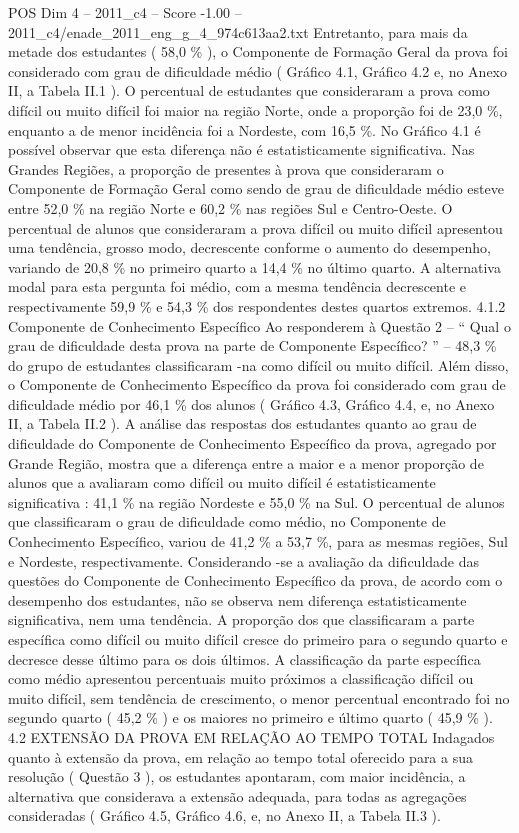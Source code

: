 \begin{textsample}{POS Dim 4 – 2011\_c4 – Score -1.00 – 2011\_c4/enade\_2011\_eng\_g\_4\_974c613aa2.txt}
Entretanto, para mais da metade dos estudantes ( 58,0 \% ), o Componente de Formação Geral da prova foi considerado com grau de dificuldade médio ( Gráfico 4.1, Gráfico 4.2 e, no Anexo II, a Tabela II.1 ).
O percentual de estudantes que consideraram a prova como difícil ou muito difícil foi maior na região Norte, onde a proporção foi de 23,0 \%, enquanto a de menor incidência foi a Nordeste, com 16,5 \%.
No Gráfico 4.1 é possível observar que esta diferença não é estatisticamente significativa.
Nas Grandes Regiões, a proporção de presentes à prova que consideraram o Componente de Formação Geral como sendo de grau de dificuldade médio esteve entre 52,0 \% na região Norte e 60,2 \% nas regiões Sul e Centro-Oeste.
O percentual de alunos que consideraram a prova difícil ou muito difícil apresentou uma tendência, grosso modo, decrescente conforme o aumento do desempenho, variando de 20,8 \% no primeiro quarto a 14,4 \% no último quarto.
A alternativa modal para esta pergunta foi médio, com a mesma tendência decrescente e respectivamente 59,9 \% e 54,3 \% dos respondentes destes quartos extremos. 4.1.2 Componente de Conhecimento Específico Ao responderem à Questão 2 – “ Qual o grau de dificuldade desta prova na parte de Componente Específico? ” – 48,3 \% do grupo de estudantes classificaram -na como difícil ou muito difícil.
Além disso, o Componente de Conhecimento Específico da prova foi considerado com grau de dificuldade médio por 46,1 \% dos alunos ( Gráfico 4.3, Gráfico 4.4, e, no Anexo II, a Tabela II.2 ).
A análise das respostas dos estudantes quanto ao grau de dificuldade do Componente de Conhecimento Específico da prova, agregado por Grande Região, mostra que a diferença entre a maior e a menor proporção de alunos que a avaliaram como difícil ou muito difícil é estatisticamente significativa : 41,1 \% na região Nordeste e 55,0 \% na Sul.
O percentual de alunos que classificaram o grau de dificuldade como médio, no Componente de Conhecimento Específico, variou de 41,2 \% a 53,7 \%, para as mesmas regiões, Sul e Nordeste, respectivamente.
Considerando -se a avaliação da dificuldade das questões do Componente de Conhecimento Específico da prova, de acordo com o desempenho dos estudantes, não se observa nem diferença estatisticamente significativa, nem uma tendência.
A proporção dos que classificaram a parte específica como difícil ou muito difícil cresce do primeiro para o segundo quarto e decresce desse último para os dois últimos.
A classificação da parte específica como médio apresentou percentuais muito próximos a classificação difícil ou muito difícil, sem tendência de crescimento, o menor percentual encontrado foi no segundo quarto ( 45,2 \% ) e os maiores no primeiro e último quarto ( 45,9 \% ). 4.2 EXTENSÃO DA PROVA EM RELAÇÃO AO TEMPO TOTAL Indagados quanto à extensão da prova, em relação ao tempo total oferecido para a sua resolução ( Questão 3 ), os estudantes apontaram, com maior incidência, a alternativa que considerava a extensão adequada, para todas as agregações consideradas ( Gráfico 4.5, Gráfico 4.6, e, no Anexo II, a Tabela II.3 ).

\end{textsample}
